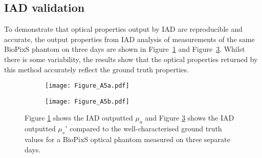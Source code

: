 
\subsection{IAD validation}\label{ap:IAD}
To demonstrate that optical properties output by IAD are reproducible and accurate, the output properties from IAD analysis of measurements of the same BioPixS phantom on three days are shown in Figure~\ref{fig:BioPixSmua} and Figure~\ref{fig:BioPixSmusp}. Whilst there is some variability, the results show that the optical properties returned by this method accurately reflect the ground truth properties.
\begin{figure}[ht!]
    \begin{subfigure}{0.49\textwidth}
        \texttt{[image: Figure\_A5a.pdf]}
        \caption{}
        \label{fig:BioPixSmua}
    \end{subfigure}
    \begin{subfigure}{0.49\textwidth}
        \texttt{[image: Figure\_A5b.pdf]}
        \caption{}
        \label{fig:BioPixSmusp}
    \end{subfigure}
    \caption{Figure \ref{fig:BioPixSmua} shows the IAD outputted $\mu_a$ and Figure \ref{fig:BioPixSmusp} shows the IAD outputted $\mu_s'$ compared to the well-characterised ground truth values for a BioPixS optical phantom measured on three separate days.}
\end{figure}

